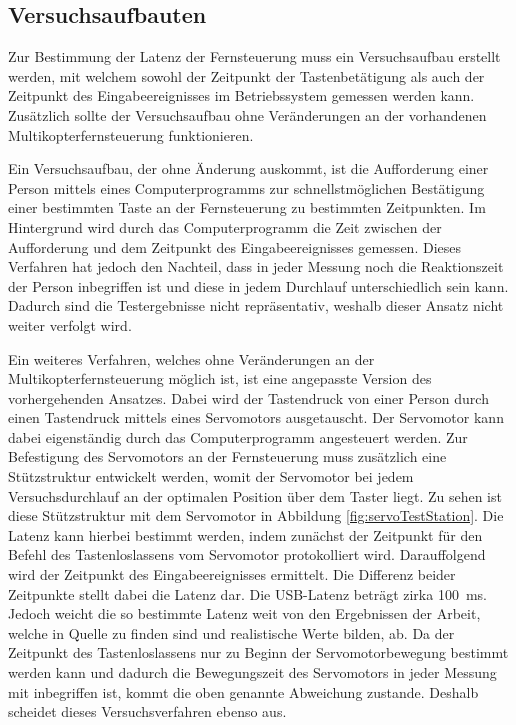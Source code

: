 \subsection{Versuchsaufbauten}
Zur Bestimmung der Latenz der Fernsteuerung muss ein Versuchsaufbau erstellt werden, mit welchem sowohl der Zeitpunkt der Tastenbetätigung als auch der Zeitpunkt des Eingabeereignisses im Betriebssystem gemessen werden kann. Zusätzlich sollte der Versuchsaufbau ohne Veränderungen an der vorhandenen Multikopterfernsteuerung funktionieren.

Ein Versuchsaufbau, der ohne Änderung auskommt, ist die Aufforderung einer Person mittels eines Computerprogramms zur schnellstmöglichen Bestätigung einer bestimmten Taste an der Fernsteuerung zu bestimmten Zeitpunkten. Im Hintergrund wird durch das Computerprogramm die Zeit zwischen der Aufforderung und dem Zeitpunkt des Eingabeereignisses gemessen. Dieses Verfahren hat jedoch den Nachteil, dass in jeder Messung noch die Reaktionszeit der Person inbegriffen ist und diese in jedem Durchlauf unterschiedlich sein kann. Dadurch sind die Testergebnisse nicht repräsentativ, weshalb dieser Ansatz nicht weiter verfolgt wird.

Ein weiteres Verfahren, welches ohne Veränderungen an der Multikopterfernsteuerung möglich ist, ist eine angepasste Version des vorhergehenden Ansatzes. Dabei wird der Tastendruck von einer Person durch einen Tastendruck mittels eines Servomotors ausgetauscht. Der Servomotor kann dabei eigenständig durch das Computerprogramm angesteuert werden. Zur Befestigung des Servomotors an der Fernsteuerung muss zusätzlich eine Stützstruktur entwickelt werden, womit der Servomotor bei jedem Versuchsdurchlauf an der optimalen Position über dem Taster liegt. Zu sehen ist diese Stützstruktur mit dem Servomotor in Abbildung \ref{fig:servoTestStation}. Die Latenz kann hierbei bestimmt werden, indem zunächst der Zeitpunkt für den Befehl des Tastenloslassens vom Servomotor protokolliert wird. Darauffolgend wird der Zeitpunkt des Eingabeereignisses ermittelt. Die Differenz beider Zeitpunkte stellt dabei die Latenz dar. Die USB-Latenz beträgt zirka 100~ms. Jedoch weicht die so bestimmte Latenz weit von den Ergebnissen der Arbeit, welche in Quelle \cite{wimmerLatenzStation} zu finden sind und realistische Werte bilden, ab. Da der Zeitpunkt des Tastenloslassens nur zu Beginn der Servomotorbewegung bestimmt werden kann und dadurch die Bewegungszeit des Servomotors in jeder Messung mit inbegriffen ist, kommt die oben genannte Abweichung zustande. Deshalb scheidet dieses Versuchsverfahren ebenso aus.


